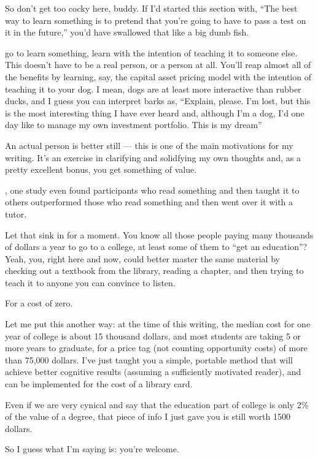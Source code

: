 So don't get too cocky
here, buddy. If I'd started this section with, ``The best way to learn
something is to pretend that you're going to have to pass a test on it
in the future,'' you'd have swallowed that like a big dumb fish.

 go to learn something, learn with the intention
of teaching it to someone else. This doesn't have to be a real person,
or a person at all. You'll reap almost all of the benefits by learning,
say, the capital asset pricing model with the intention of teaching it
to your dog. I mean, dogs are at least more interactive than rubber
ducks, and I guess you can interpret barks as, ``Explain, please. I'm lost, but
this is the most interesting thing I have ever heard and, although I'm a dog,
I'd one day like to manage my own investment portfolio. This is my dream''

An actual person is better still --- this is one of the main motivations
for my writing. It's an exercise in clarifying and solidfying my own
thoughts and, as a pretty excellent bonus, you get something of
value.

, one study even found participants who read something and then
taught it to others outperformed those who read something and then went
over it with a tutor.

Let that sink in for a moment. You know all those people paying many
thousands of dollars a year to go to a college, at least some of them to
``get an education''? Yeah, you, right here and now, could better master
the same material by checking out a textbook from the library, reading a
chapter, and then trying to teach it to anyone you can convince to
listen.

For a cost of zero.

Let me put this another way: at the time of this writing, the median
cost for one year of college is about 15 thousand dollars, and most
students are taking 5 or more years to graduate, for a price tag (not
counting opportunity costs) of more than 75,000 dollars. I've just
taught you a simple, portable method that will achieve better cognitive
results (assuming a sufficiently motivated reader), and can be
implemented for the cost of a library card.

Even if we are very cynical and say that the education part of college
is only 2\% of the value of a degree, that piece of info I just gave you
is still worth 1500 dollars.

So I guess what I'm saying is: you're welcome.

